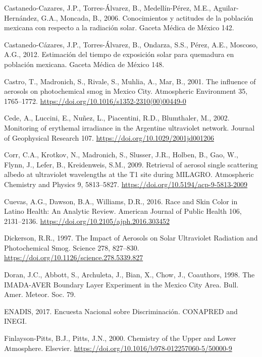 \documentclass[10pt]{article}
\begin{document}
\label{csl:40}Castanedo-Cazares, J.P., Torres-Álvarez, B., Medellín-Pérez, M.E., Aguilar-Hernández, G.A., Moncada, B., 2006. {Conocimientos y actitudes de la población mexicana con respecto a la radiación solar}. Gaceta Médica de México 142.

\label{csl:39}Castanedo-Cázares, J.P., Torres-Álvarez, B., Ondarza, S.S., Pérez, A.E., Moscoso, A.G., 2012. {Estimación del tiempo de exposición solar para quemadura en población mexicana}. Gaceta Médica de México 148.

\label{csl:14}Castro, T., Madronich, S., Rivale, S., Muhlia, A., Mar, B., 2001. {The influence of aerosols on photochemical smog in Mexico City}. Atmospheric Environment 35, 1765–1772. \url{https://doi.org/10.1016/s1352-2310(00)00449-0}

\label{csl:25}Cede, A., Luccini, E., Nuñez, L., Piacentini, R.D., Blumthaler, M., 2002. {Monitoring of erythemal irradiance in the Argentine ultraviolet network}. Journal of Geophysical Research 107. \url{https://doi.org/10.1029/2001jd001206}

\label{csl:21}Corr, C.A., Krotkov, N., Madronich, S., Slusser, J.R., Holben, B., Gao, W., Flynn, J., Lefer, B., Kreidenweis, S.M., 2009. {Retrieval of aerosol single scattering albedo at ultraviolet wavelengths at the T1 site during {MILAGRO}}. Atmospheric Chemistry and Physics 9, 5813–5827. \url{https://doi.org/10.5194/acp-9-5813-2009}

\label{csl:46}Cuevas, A.G., Dawson, B.A., Williams, D.R., 2016. {Race and Skin Color in Latino Health: An Analytic Review}. American Journal of Public Health 106, 2131–2136. \url{https://doi.org/10.2105/ajph.2016.303452}

\label{csl:12}Dickerson, R.R., 1997. {The Impact of Aerosols on Solar Ultraviolet Radiation and Photochemical Smog}. Science 278, 827–830. \url{https://doi.org/10.1126/science.278.5339.827}

\label{csl:2}Doran, J.C., Abbott, S., Archuleta, J., Bian, X., Chow, J., Coauthors, 1998. {The IMADA-AVER Boundary Layer Experiment in the Mexico City Area}. Bull. Amer. Meteor. Soc. 79.

\label{csl:49}ENADIS, 2017. {Encuesta Nacional sobre Discriminación}. CONAPRED and INEGI.

\label{csl:11}Finlayson-Pitts, B.J., Pitts, J.N., 2000. {Chemistry of the Upper and Lower Atmosphere}. Elsevier. \url{https://doi.org/10.1016/b978-012257060-5/50000-9}
\end{document}
